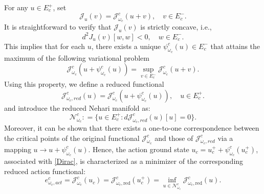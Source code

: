 \documentclass{amsart}
\theoremstyle{plain}
\theoremstyle{definition}
\theoremstyle{remark}
\numberwithin{equation}{section} \numberwithin{figure}{section}
\begin{document}
 


 
For any \( u \in E_c^+ \), set
\[
\mathcal{J}_u(v)=\mathcal{J}_{\omega_c}^c(u+v),\quad v\in E_c^-.
\]
 It is straightforward to verify that \( \mathcal{J}_u(v) \) is strictly concave, i.e.,  
\[
d^2J_u(v)[w,w] < 0, \quad w\in E_c^-.
\]  
This implies that for each \( u \), there exists a unique \( \psi_{\omega_c}^c(u)\in E_c^- \)
 that attains the maximum of the following variational problem
 \[
 \mathcal{J}_{\omega_c}^c(u+ \psi_{\omega_c}^c(u))= \sup_{v\in E_c^-}\mathcal{J}_{\omega_c}^c(u+v).
 \]
 Using this property, we define a reduced functional 
 \[
 \mathcal{J}_{\omega_c, red}^c(u)=  \mathcal{J}_{\omega_c}^c(u+ \psi_{\omega_c}^c(u)), \quad u\in E_c^+.
 \]
 and introduce the reduced Nehari manifold as:  
\[
\mathcal{N}_{\omega_c}^c: = \{ u \in E_c^+ :d\mathcal{J}_{\omega_c, red}^c(u)[u]  = 0 \}.
\]  
Moreover, it can be shown that there exists a one-to-one correspondence between the critical points of the original functional
 \( \mathcal{J}_{\omega_c}^c \) and those of \( \mathcal{J}_{\omega_c, red}^c \) via a mapping \( u\to u+ \psi_{\omega_c}^c(u) \). 
 Hence, the action ground state \( u_c = u_c^+ + \psi_{\omega_c}^c(u_c^+) \), associated with \eqref{Dirac},
 is characterized as a minimizer of the corresponding reduced action functional:  
\[
e_{\omega_c, act}^c=\mathcal{J}_{\omega_c}^c(u_c) = \mathcal{J}_{\omega_c, \text{red}}^c(u_c^+) = \inf_{u \in \mathcal{N}_{\omega_c}^c} \mathcal{J}_{\omega_c, \text{red}}^c(u).
\]  
\end{document}
